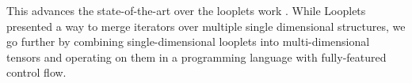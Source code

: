 \begin{enumerate}

\end{enumerate}

This advances the state-of-the-art over the looplets work \cite{ahrens_looplets_2023}. While Looplets presented a way to merge iterators over multiple single dimensional structures, we go further by combining single-dimensional looplets into multi-dimensional tensors and operating on them in a programming language with fully-featured control flow.
